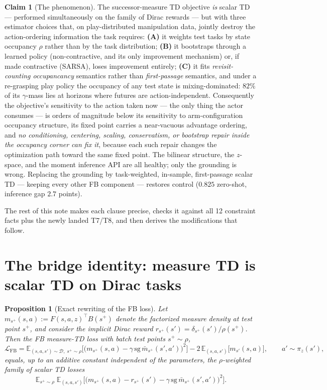 \documentclass[11pt]{article}
\newcommand{\E}{\mathbb{E}}
\newcommand{\sg}{\mathrm{sg}}
\newtheorem{proposition}{Proposition}
\theoremstyle{definition}
\newtheorem{claim}{Claim}
\theoremstyle{remark}
\begin{document}
\begin{claim}[The phenomenon]\label{claim:main}
The successor-measure TD objective \emph{is} scalar TD --- performed simultaneously on the
family of Dirac rewards --- but with three estimator choices that, on play-distributed
manipulation data, jointly destroy the action-ordering information the task requires:
\textbf{(A)} it weights test tasks by state occupancy $\rho$ rather than by the task
distribution; \textbf{(B)} it bootstraps through a learned policy (non-contractive, and its
only improvement mechanism) or, if made contractive (SARSA), loses improvement entirely;
\textbf{(C)} it fits \emph{revisit-counting occupancancy} semantics rather than
\emph{first-passage} semantics, and under a re-grasping play policy the occupancy of any test
state is mixing-dominated: $82\%$ of its $\gamma$-mass lies at horizons where futures are
action-independent. Consequently the objective's sensitivity to the action taken now --- the
only thing the actor consumes --- is orders of magnitude below its sensitivity to
arm-configuration occupancy structure, its fixed point carries a near-vacuous advantage
ordering, and \emph{no conditioning, centering, scaling, conservatism, or bootstrap repair
inside the occupancy corner can fix it}, because each such repair changes the optimization
path toward the same fixed point. The bilinear structure, the $z$-space, and the moment
inference API are all healthy; only the grounding is wrong. Replacing the grounding by
task-weighted, in-sample, first-passage scalar TD --- keeping every other FB component ---
restores control ($0.825$ zero-shot, inference gap $2.7$ points).
\end{claim}

The rest of this note makes each clause precise, checks it against all 12 constraint facts
plus the newly landed T7/T8, and then derives the modifications that follow.

\section{The bridge identity: measure TD is scalar TD on Dirac tasks}\label{sec:identity}

\begin{proposition}[Exact rewriting of the FB loss]\label{prop:identity}
Let $m_{s^+}(s,a):=F(s,a,z)^\top B(s^+)$ denote the factorized measure density at test point
$s^+$, and consider the implicit Dirac reward $r_{s^+}(s')=\delta_{s^+}(s')/\rho(s^+)$. Then
the FB measure-TD loss with batch test points $s^+\sim\rho$,
\begin{equation}
\mathcal L_{\mathrm{FB}}
=\E_{(s,a,s')\sim\mathcal D,\;s^+\sim\rho}\Big[\big(m_{s^+}(s,a)-\gamma\,\sg\,\bar
m_{s^+}(s',a')\big)^2\Big]
-2\,\E_{(s,a,s')}\big[m_{s'}(s,a)\big],\qquad a'\sim\pi_z(s'),
\label{eq:fbloss}
\end{equation}
equals, up to an additive constant independent of the parameters, the $\rho$-weighted
family of scalar TD losses
\begin{equation}
\E_{s^+\sim\rho}\;\E_{(s,a,s')}\Big[\big(m_{s^+}(s,a)-r_{s^+}(s')-\gamma\,\sg\,\bar
m_{s^+}(s',a')\big)^2\Big].
\label{eq:scalarfamily}
\end{equation}
\end{proposition}
\end{document}
